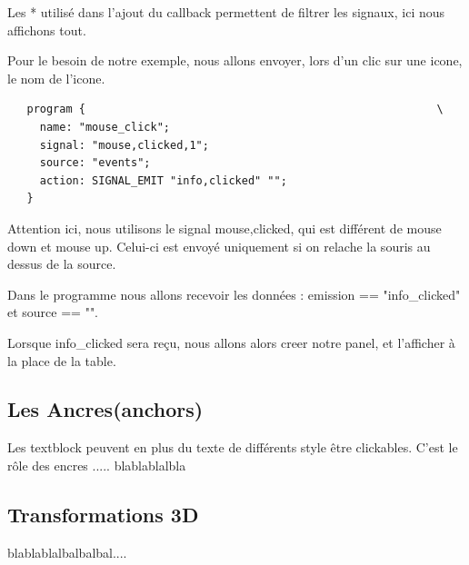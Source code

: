 \documentclass[a4paper]{efr}
\begin{document}
Les * utilisé dans l'ajout du callback permettent de filtrer les signaux, ici
nous affichons tout.

Pour le besoin de notre exemple, nous allons envoyer, lors d'un clic sur une
icone, le nom de l'icone.
\begin{lstlisting}
   program {                                                      \
     name: "mouse_click";
     signal: "mouse,clicked,1";
     source: "events";
     action: SIGNAL_EMIT "info,clicked" "";
   }
\end{lstlisting}

Attention ici, nous utilisons le signal mouse,clicked, qui est différent de
mouse down et mouse up. Celui-ci est envoyé uniquement si on relache la souris
au dessus de la source.

Dans le programme nous allons recevoir les données : emission == "info\_clicked"
et source == "".

Lorsque info\_clicked sera reçu, nous allons alors creer notre panel, et
l'afficher à la place de la table.

\subsection{Les Ancres(anchors)}

Les textblock peuvent en plus du texte de différents style être clickables.
C'est le rôle des encres ..... blablablalbla

\subsection{Transformations 3D}

blablablalbalbalbal....
\end{document}
